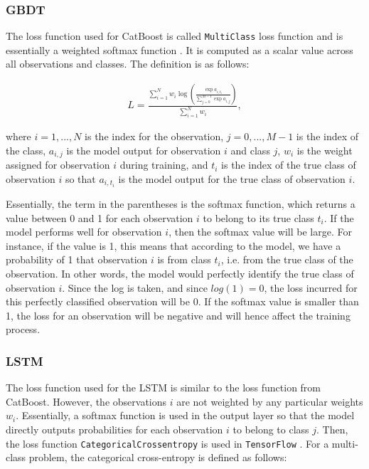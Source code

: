 \documentclass{article}
\begin{document}
	\subsubsection{GBDT}
	
	The loss function used for CatBoost is called \lstinline{MultiClass} loss function and is essentially a weighted softmax function \cite{noauthor_multiclassification:_nodate}. It is computed as a scalar value across all observations and classes. The definition is as follows:
	
	\begin{align}
	L = \frac{\sum_{i = 1}^N w_i \log \left(\frac{\exp a_{i, t_i}}{\sum_{j = 0}^{M-1} \exp a_{i, j}}\right)}{\sum_{i = 1}^N w_i}, 
	\end{align}
	
	where $i = 1, ..., N$ is the index for the observation, $j = 0, ..., M-1$ is the index of the class, $a_{i, j}$ is the model output for observation $i$ and class $j$, $w_i$ is the weight assigned for observation $i$ during training, and $t_i$ is the index of the true class of observation $i$ so that $a_{i, t_i}$ is the model output for the true class of observation $i$.
	
	Essentially, the term in the parentheses is the softmax function, which returns a value between 0 and 1 for each observation $i$ to belong to its true class $t_i$. If the model performs well for observation $i$, then the softmax value will be large. For instance, if the value is 1, this means that according to the model, we have a probability of 1 that observation $i$ is from class $t_i$, i.e. from the true class of the observation. In other words, the model would perfectly identify the true class of observation $i$. Since the log is taken, and since $log(1)=0$, the loss incurred for this perfectly classified observation will be 0. If the softmax value is smaller than 1, the loss for an observation will be negative and will hence affect the training process.
		
	\subsubsection{LSTM}
	
	The loss function used for the LSTM is similar to the loss function from CatBoost. However, the observations $i$ are not weighted by any particular weights $w_i$. Essentially, a softmax function is used in the output layer so that the model directly outputs probabilities for each observation $i$ to belong to class $j$. Then, the loss function \lstinline{CategoricalCrossentropy} is used in \lstinline{TensorFlow} \cite{noauthor_module:_nodate}. For a multi-class problem, the categorical cross-entropy is defined as follows:
	
\end{document}
